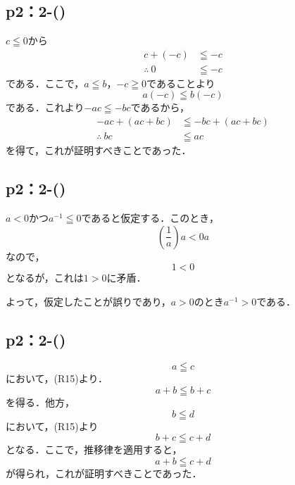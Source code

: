 \newpage

\subsection*{p2：2-()}
\begin{tproof}
    $c \leqq 0$から
    \begin{align*}
        c+(-c)         & \leqq -c \\
        \therefore ~ 0 & \leqq -c
    \end{align*}
    である．ここで，$a \leqq b$，$-c \geqq 0$であることより
    \[
        a(-c) \leqq b (-c)
    \]
    である．これより$ -ac \leqq -bc$であるから，
    \begin{align*}
        -ac + (ac+bc)   & \leqq -bc +(ac+bc) \\
        \therefore ~ bc & \leqq ac
    \end{align*}
    を得て，これが証明すべきことであった．
\end{tproof}

\subsection*{p2：2-()}
\begin{tproof}
    $a<0$かつ$a^{-1} \leqq 0$であると仮定する．このとき，
    \[
        \left( \frac{1}{a} \right) a < 0a
    \]
    なので，
    \[
        1<0
    \]
    となるが，これは$1>0$に矛盾．

    よって，仮定したことが誤りであり，$a>0$のとき$a^{-1} >0$である．
\end{tproof}

\subsection*{p2：2-()}
\begin{tproof}
    \[
        a \leqq c
    \]
    において，(R15)より．
    \[
        a+b \leqq b+c
    \]
    を得る．他方，
    \[
        b \leqq d
    \]
    において，(R15)より
    \[
        b + c \leqq c+d
    \]
    となる．ここで，推移律を適用すると，
    \[
        a+b \leqq c+d
    \]
    が得られ，これが証明すべきことであった．
\end{tproof}
%
